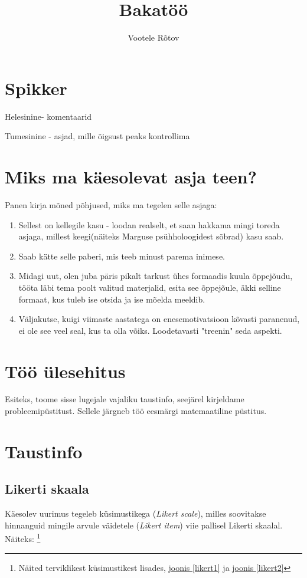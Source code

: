 \documentclass[a4paper]{article}
\author{Vootele Rõtov}
\title{Bakatöö}
\begin{document}
\maketitle

\pagebreak

\tableofcontents

\pagebreak

\section*{Spikker}

{\color{cyan} Helesinine- komentaarid}

{\color{blue} Tumesinine - asjad, mille õigsust peaks kontrollima}


{\color{cyan}\section*{Miks ma käesolevat asja teen?}

Panen kirja mõned põhjused, miks ma tegelen selle asjaga:
\begin{enumerate}[I]
\item Sellest on kellegile kasu - loodan realselt, et saan hakkama mingi toreda asjaga, millest keegi(näiteks Marguse psühholoogidest sõbrad) kasu saab.
\item Saab kätte selle paberi, mis teeb minust parema inimese. 
\item Midagi uut, olen juba päris pikalt tarkust ühes formaadis kuula õppejõudu, tööta läbi tema poolt valitud materjalid, esita see õppejõule, äkki selline formaat, kus tuleb ise otsida ja ise mõelda meeldib.
\item Väljakutse, kuigi viimaste aastatega on enesemotivatsioon kõvasti paranenud, ei ole see veel seal, kus ta olla võiks. Loodetavasti "treenin" seda aspekti.
\end{enumerate}}

\section{Töö \"ulesehitus}
Esiteks, toome sisse lugejale vajaliku taustinfo, seejärel kirjeldame probleemip\"ustitust. Sellele järgneb töö eesmärgi matemaatiline p\"ustitus.

\section{Taustinfo}

\subsection{Likerti skaala
}
Käesolev uurimus tegeleb k\"usimustikega (\textit{Likert scale}), milles soovitakse hinnanguid mingile arvule väidetele (\textit{Likert item}) viie pallisel Likerti skaalal.\cite{Edmondson} Näiteks: \footnote{Näited terviklikest k\"usimustikest lisades, \hyperref[likert1]{joonis \ref*{likert1}} ja \hyperref[likert2]{joonis \ref*{likert2}}}
\end{document}
